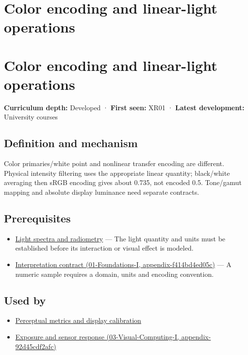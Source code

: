 \hypertarget{appendix-a9f83ad40792}{}
\section*{Color encoding and linear-light operations}
\section{Color encoding and linear-light operations}\label{appendix-a9f83ad40792-color-encoding-and-linear-light-operations}

\textbf{Curriculum depth:} Developed · \textbf{First seen:} XR01 · \textbf{Latest development:} University courses

\subsection{Definition and mechanism}\label{appendix-a9f83ad40792-definition-and-mechanism}

Color primaries/white point and nonlinear transfer encoding are different. Physical intensity filtering uses the appropriate linear quantity; black/white averaging then sRGB encoding gives about 0.735, not encoded 0.5. Tone/gamut mapping and absolute display luminance need separate contracts.

\subsection{Prerequisites}\label{appendix-a9f83ad40792-prerequisites}

\begin{itemize}
\tightlist
\item
  \hyperref[appendix-215c2570199b]{Light spectra and radiometry} --- The light quantity and units must be established before its interaction or visual effect is modeled.
\item
  \href{../01-Foundations-I/main.pdf\#nameddest=appendix-f414bd4ed05c}{Interpretation contract (01-Foundations-I, appendix-f414bd4ed05c)} --- A numeric sample requires a domain, units and encoding convention.
\end{itemize}

\subsection{Used by}\label{appendix-a9f83ad40792-used-by}

\begin{itemize}
\tightlist
\item
  \hyperref[appendix-b2c1846508bf]{Perceptual metrics and display calibration}
\item
  \href{../03-Visual-Computing-I/main.pdf\#nameddest=appendix-92d45cdf2afc}{Exposure and sensor response (03-Visual-Computing-I, appendix-92d45cdf2afc)}
\end{itemize}

